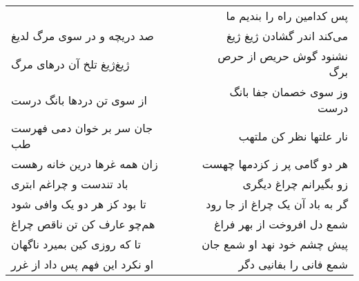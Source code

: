 \begin{center}
\begin{longtable}{l p{0.5cm} r}
&&
پس کدامین راه را بندیم ما
\\
صد دریچه و در سوی مرگ لدیغ
&&
می‌کند اندر گشادن ژیغ ژیغ
\\
ژیغ‌ژیغ تلخ آن درهای مرگ
&&
نشنود گوش حریص از حرص برگ
\\
از سوی تن دردها بانگ درست
&&
وز سوی خصمان جفا بانگ درست
\\
جان سر بر خوان دمی فهرست طب
&&
نار علتها نظر کن ملتهب
\\
زان همه غرها درین خانه رهست
&&
هر دو گامی پر ز کزدمها چهست
\\
باد تندست و چراغم ابتری
&&
زو بگیرانم چراغ دیگری
\\
تا بود کز هر دو یک وافی شود
&&
گر به باد آن یک چراغ از جا رود
\\
هم‌چو عارف کن تن ناقص چراغ
&&
شمع دل افروخت از بهر فراغ
\\
تا که روزی کین بمیرد ناگهان
&&
پیش چشم خود نهد او شمع جان
\\
او نکرد این فهم پس داد از غرر
&&
شمع فانی را بفانیی دگر
\\
\end{longtable}
\end{center}

